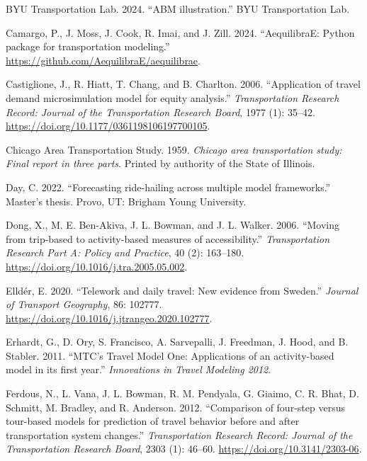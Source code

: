 \documentclass[fancy, twoside, mastersfancy, ms]{byuthesis}
\newlength{\cslhangindent}
\newenvironment{CSLReferences}[2] %
 {\begin{list}{}{%
  \setlength{\itemindent}{0pt}
  \setlength{\leftmargin}{0pt}
  \setlength{\parsep}{0pt}
  \ifodd #1
   \setlength{\leftmargin}{\cslhangindent}
   \setlength{\itemindent}{-1\cslhangindent}
  \fi
  \setlength{\itemsep}{#2\baselineskip}}}
 {\end{list}}
\begin{document}
\begin{CSLReferences}{1}{0}
BYU Transportation Lab. 2024. {``{ABM} illustration.''} BYU
Transportation Lab.

Camargo, P., J. Moss, J. Cook, R. Imai, and J. Zill. 2024.
{``{AequilibraE}: Python package for transportation modeling.''}
\url{https://github.com/AequilibraE/aequilibrae}.

Castiglione, J., R. Hiatt, T. Chang, and B. Charlton. 2006.
{``Application of travel demand microsimulation model for equity
analysis.''} \emph{Transportation Research Record: Journal of the
Transportation Research Board}, 1977 (1): 35--42.
\url{https://doi.org/10.1177/0361198106197700105}.

Chicago Area Transportation Study. 1959. \emph{Chicago area
transportation study: Final report in three parts}. Printed by authority
of the State of Illinois.

Day, C. 2022. {``Forecasting ride-hailing across multiple model
frameworks.''} Master's thesis. Provo, UT: Brigham Young University.

Dong, X., M. E. Ben-Akiva, J. L. Bowman, and J. L. Walker. 2006.
{``Moving from trip-based to activity-based measures of
accessibility.''} \emph{Transportation Research Part A: Policy and
Practice}, 40 (2): 163--180.
\url{https://doi.org/10.1016/j.tra.2005.05.002}.

Elldér, E. 2020. {``Telework and daily travel: New evidence from
{Sweden}.''} \emph{Journal of Transport Geography}, 86: 102777.
\url{https://doi.org/10.1016/j.jtrangeo.2020.102777}.

Erhardt, G., D. Ory, S. Francisco, A. Sarvepalli, J. Freedman, J. Hood,
and B. Stabler. 2011. {``{MTC}'s {Travel Model One}: Applications of an
activity-based model in its first year.''} \emph{Innovations in Travel
Modeling 2012}.

Ferdous, N., L. Vana, J. L. Bowman, R. M. Pendyala, G. Giaimo, C. R.
Bhat, D. Schmitt, M. Bradley, and R. Anderson. 2012. {``Comparison of
four-step versus tour-based models for prediction of travel behavior
before and after transportation system changes.''} \emph{Transportation
Research Record: Journal of the Transportation Research Board}, 2303
(1): 46--60. \url{https://doi.org/10.3141/2303-06}.


\end{CSLReferences}
\end{document}
